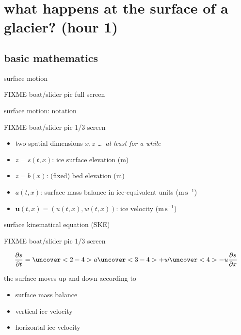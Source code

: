 \documentclass[10pt]{beamer}
\newcommand{\bu}{\mathbf{u}}
\begin{document}
\section[what happens at the surface of a glacier?]{\textbf{what happens at the surface of a glacier?} (hour 1)}

\subsection{basic mathematics}

\begin{frame}{surface motion}
  \begin{center}
  FIXME boat/slider pic full screen
  \end{center}

\end{frame}

\begin{frame}{surface motion: notation}
  \begin{center}
  FIXME boat/slider pic 1/3 screen
  \end{center}

\begin{itemize}
\item two spatial dimensions $x,z$ \hfill \emph{\dots\, at least for a while}
\item $z = s(t,x)$: ice surface elevation (m)
\item $z = b(x)$: (fixed) bed elevation (m)
\item $a(t,x)$: surface mass balance in ice-equivalent units ($\text{m}\,\text{s}^{-1}$)
\item $\bu(t,x)=(u(t,x),w(t,x))$: ice velocity ($\text{m}\,\text{s}^{-1}$)
\end{itemize}
\end{frame}

\begin{frame}{surface kinematical equation (SKE)}
  \begin{center}
  FIXME boat/slider pic 1/3 screen
  \end{center}

\begin{equation*}
\frac{\partial s}{\partial t} = \uncover<2-4>{a} \uncover<3-4>{+w} \uncover<4>{-u \frac{\partial s}{\partial x}}
\end{equation*}

the surface moves up and down according to
\begin{itemize}
\item<2-4> surface mass balance
\item<3-4> vertical ice velocity
\item<4> horizontal ice velocity
\end{itemize}
\end{frame}
\end{document}
